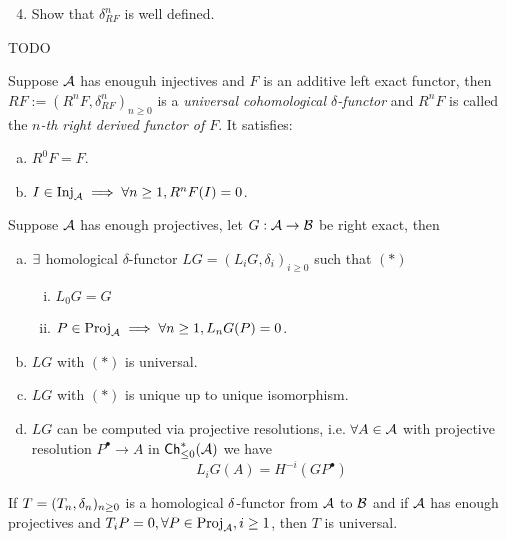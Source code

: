 \documentclass[a4paper]{report}
\begin{document}
\begin{enumerate}\setcounter{enumi}{3}
        \item Show that $\delta_{RF}^{n}$ is well defined.
\end{enumerate}
\begin{lemm}
TODO
\end{lemm}
\begin{thm}
  Suppose $\mathcal{A}$ has enouguh injectives and $F$ is an additive left exact functor, then $RF:= (R^{n}F, \delta_{RF}^{n})_{n \ge 0}$ is a \emph{universal cohomological $\delta$-functor} and $R^{n}F$ is called the \emph{$n$-th right derived functor of $F$}. It satisfies:
  \begin{enumerate}[(a)]
    \item $R^{0}F = F$.
          \item $I \in \operatorname{Inj}_{\mathcal{A}} \implies \forall n \ge 1, R^{n}F(I)=0$.
  \end{enumerate}
  Suppose $\mathcal{A}$ has enough projectives, let $G: \mathcal{A}\to \mathcal{B}$ be right exact, then
  \begin{enumerate}[(a)]
    \item $\exists$ homological $\delta$-functor $LG = (L_{i}G, \delta_{i})_{i \ge 0}$ such that $(*)$
          \begin{enumerate}[(i)]
            \item $L_{0}G = G$
          \item $P \in \operatorname{Proj}_{\mathcal{A}} \implies \forall n \ge 1, L_{n}G(P)=0$.
          \end{enumerate}
          \item $LG$ with $(*)$ is universal.
    \item $LG$ with $(*)$ is unique up to unique isomorphism.
          \item $LG$ can be computed via projective resolutions, i.e. $\forall A \in \mathcal{A}$ with projective resolution $P^{\bullet} \to A$ in $\mathsf{Ch}^*_{\le 0}(\mathcal{A})$ we have \[L_{i}G(A) = H^{-i}(GP^{\bullet})\]
  \end{enumerate}
\end{thm}

\begin{lemm*}
If $T=(T_{n},\delta_{n})_{n \ge 0}$ is a homological $\delta$-functor from $\mathcal{A}$ to $\mathcal{B}$ and if $\mathcal{A}$ has enough projectives and $T_{i}P=0, \forall P \in \operatorname{Proj}_{\mathcal{A}}, i \ge 1$, then $T$ is universal.
\end{lemm*}
\end{document}
